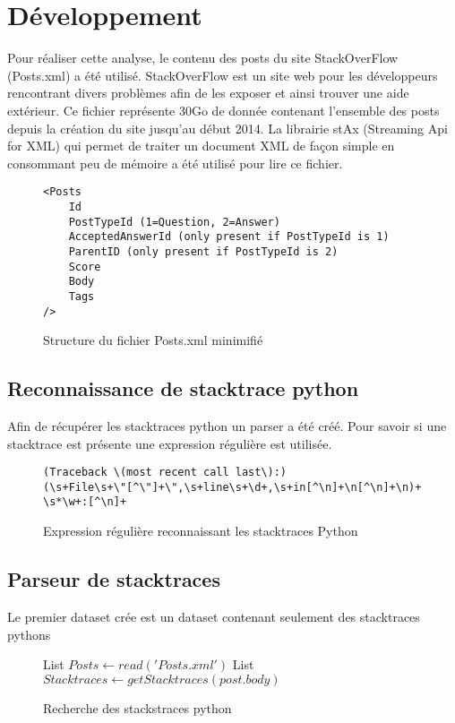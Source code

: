 \section{Développement}
Pour réaliser cette analyse, le contenu des posts du site StackOverFlow (Posts.xml) a été utilisé. StackOverFlow est un site web pour les développeurs rencontrant divers problèmes afin de les exposer et ainsi trouver une aide extérieur. Ce fichier représente 30Go de donnée contenant l'ensemble des posts depuis la création du site jusqu'au début 2014.
La librairie stAx (Streaming Api for XML) qui permet de traiter un document XML de façon simple en consommant peu de mémoire a été utilisé pour lire ce fichier.
\begin{figure}
\begin{lstlisting}
<Posts
	Id
	PostTypeId (1=Question, 2=Answer)
	AcceptedAnswerId (only present if PostTypeId is 1)
	ParentID (only present if PostTypeId is 2)
	Score
	Body
	Tags
/>
\end{lstlisting}
\caption{Structure du fichier Posts.xml minimifié}
\label{code:posts}
\end{figure}

\subsection{Reconnaissance de stacktrace python}
Afin de récupérer les stacktraces python un parser a été créé. Pour savoir si une stacktrace est présente une expression régulière est utilisée.
\begin{figure}
\begin{lstlisting}
(Traceback \(most recent call last\):)
(\s+File\s+\"[^\"]+\",\s+line\s+\d+,\s+in[^\n]+\n[^\n]+\n)+
\s*\w+:[^\n]+
\end{lstlisting}
\caption{Expression régulière reconnaissant les stacktraces Python}
\label{code:regex}
\end{figure}

\subsection{Parseur de stacktraces}
Le premier dataset crée est un dataset contenant seulement  des stacktraces pythons
\begin{figure}[!h]
\begin{center}
\begin{algorithmic}
	\State List $Posts \gets read('Posts.xml')$
		\State List $Stacktraces \gets getStacktraces(post.body)$
		\EndFor
	\EndFor
\EndFunction
\end{algorithmic}
\caption{Recherche des stackstraces python}
\label{Recherche des stackstraces python}
\end{center}
\end{figure}

